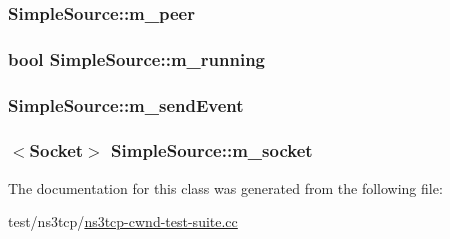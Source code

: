 \subsubsection[{\texorpdfstring{m\+\_\+peer}{m_peer}}]{ Simple\+Source\+::m\+\_\+peer\hspace{0.3cm}{\ttfamily [private]}}\hypertarget{classSimpleSource_a05cef89d61cdb9579ece4ba755a5c99b}{}\label{classSimpleSource_a05cef89d61cdb9579ece4ba755a5c99b}
\subsubsection[{\texorpdfstring{m\+\_\+running}{m_running}}]{\setlength{\rightskip}{0pt plus 5cm}bool Simple\+Source\+::m\+\_\+running\hspace{0.3cm}{\ttfamily [private]}}\hypertarget{classSimpleSource_a08f955c3d083377435e9f21b3405622b}{}\label{classSimpleSource_a08f955c3d083377435e9f21b3405622b}
\subsubsection[{\texorpdfstring{m\+\_\+send\+Event}{m_sendEvent}}]{ Simple\+Source\+::m\+\_\+send\+Event\hspace{0.3cm}{\ttfamily [private]}}\hypertarget{classSimpleSource_a7e0795f453e3306199282cd3c235c866}{}\label{classSimpleSource_a7e0795f453e3306199282cd3c235c866}
\subsubsection[{\texorpdfstring{m\+\_\+socket}{m_socket}}]{$<${\bf Socket}$>$ Simple\+Source\+::m\+\_\+socket\hspace{0.3cm}{\ttfamily [private]}}\hypertarget{classSimpleSource_a907dc21e5f820d0ffb8d31cc0fbc0119}{}\label{classSimpleSource_a907dc21e5f820d0ffb8d31cc0fbc0119}


The documentation for this class was generated from the following file\+:\begin{DoxyCompactItemize}
\item 
test/ns3tcp/\hyperlink{ns3tcp-cwnd-test-suite_8cc}{ns3tcp-\/cwnd-\/test-\/suite.\+cc}\end{DoxyCompactItemize}
